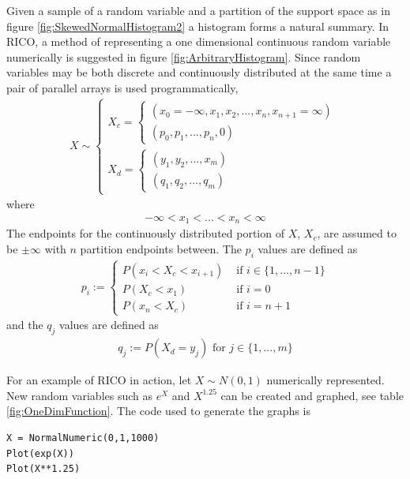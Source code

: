 Given a sample of a random variable and a partition of the support space as in figure \ref{fig:SkewedNormalHistogram2} a histogram forms a natural summary. In RICO, a method of representing a one dimensional continuous random variable numerically is suggested in figure \ref{fig:ArbitraryHistogram}. Since random variables may be both discrete and continuously distributed at the same time a pair of parallel arrays is used programmatically,
\begin{align*}
X \sim \begin{cases}
    X_c = \begin{cases}
    (x_0 = -\infty, x_1, x_2, ..., x_n, x_{n+1} = \infty)\\
    (p_0, p_1, ..., p_n, 0)
    \end{cases}\\
    X_d = \begin{cases}
    (y_1, y_2, ..., x_m)\\
    (q_1, q_2, ..., q_m)
    \end{cases}
  \end{cases}
\end{align*}
where
\begin{align*}
-\infty < x_1 < ... < x_n < \infty
\end{align*}
The endpoints for the continuously distributed portion of $X$, $X_c$, are assumed to be $\pm \infty$ with $n$ partition endpoints between. The $p_i$ values are defined as
\begin{align*}
p_i := \begin{cases}
  P(x_i < X_c < x_{i+1}) & \text{ if } i \in \{1, ..., n-1\}\\
  P(X_c < x_1) & \text{ if } i = 0\\
  P(x_n < X_c) & \text{ if } i = n+1
  \end{cases}
\end{align*}
and the $q_j$ values are defined as
\begin{align*}
q_j := P(X_d = y_j) \text{ for } j \in \{1, ..., m\}
\end{align*}

For an example of RICO in action, let $X \sim N(0,1)$ numerically represented. New random variables such as $e^X$ and $X^{1.25}$ can be created and graphed, see table \ref{fig:OneDimFunction}. The code used to generate the graphs is

\begin{lstlisting}
X = NormalNumeric(0,1,1000)
Plot(exp(X))
Plot(X**1.25)
\end{lstlisting}


